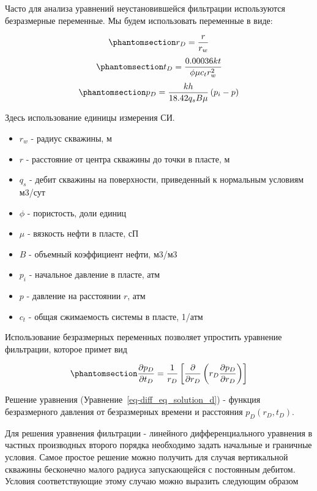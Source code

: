 \documentclass[
  russian,
  letterpaper,
  DIV=11,
  numbers=noendperiod,
  oneside]{scrartcl}
\providecommand{\tightlist}{%
  \setlength{\itemsep}{0pt}\setlength{\parskip}{0pt}}
\begin{document}
Часто для анализа уравнений неустановившейся фильтрации используются
безразмерные переменные. Мы будем использовать переменные в виде:

\begin{equation}\phantomsection\label{eq-rd}{ 
r_D = \frac{r}{r_w}  
}\end{equation} \begin{equation}\phantomsection\label{eq-td}{ 
t_D = \frac{0.00036 kt}{\phi \mu c_t r_w^2}  
}\end{equation} \begin{equation}\phantomsection\label{eq-pd}{ 
p_D = \frac{kh}{ 18.42 q_s B \mu} \left( p_i - p \right)   
}\end{equation}

Здесь использование единицы измерения СИ.

\begin{itemize}
\tightlist
\item
  \(r_w\) - радиус скважины, м
\item
  \(r\) - расстояние от центра скважины до точки в пласте, м
\item
  \(q_s\) - дебит скважины на поверхности, приведенный к нормальным
  условиям м3/сут
\item
  \(\phi\) - пористость, доли единиц
\item
  \(\mu\) - вязкость нефти в пласте, сП
\item
  \(B\) - объемный коэффициент нефти, м3/м3
\item
  \(p_i\) - начальное давление в пласте, атм
\item
  \(p\) - давление на расстоянии \(r\), атм
\item
  \(c_t\) - общая сжимаемость системы в пласте, 1/атм
\end{itemize}

Использование безразмерных переменных позволяет упростить уравнение
фильтрации, которое примет вид

\begin{equation}\phantomsection\label{eq-diff_eq_solution_d}{  
\frac{\partial p_D}{ \partial t_D} = \dfrac{1}{r_D} \left[ \dfrac{\partial}{\partial r_D} \left( r_D \dfrac{ \partial p_D} {\partial r_D} \right) \right] 
}\end{equation}

Решение уравнения (Уравнение~\ref{eq-diff_eq_solution_d}) - функция
безразмерного давления от безразмерных времени и расстояния
\(p_D(r_D, t_D)\).

Для решения уравнения фильтрации - линейного дифференциального уравнения
в частных производных второго порядка необходимо задать начальные и
граничные условия. Самое простое решение можно получить для случая
вертикальной скважины бесконечно малого радиуса запускающейся с
постоянным дебитом. Условия соответствующие этому случаю можно выразить
следующим образом
\end{document}
